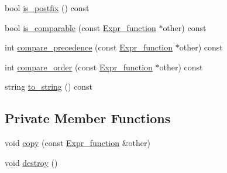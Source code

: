 \begin{DoxyCompactItemize}
bool \hyperlink{classgenevalmag_1_1Expr__function_a8ef52d8fec97d084be0b24e5207a0551}{is\_\-postfix} () const 
\item 
bool \hyperlink{classgenevalmag_1_1Expr__function_a24aaf520c742fde5eff5c8c596549009}{is\_\-comparable} (const \hyperlink{classgenevalmag_1_1Expr__function}{Expr\_\-function} $\ast$other) const 
\item 
int \hyperlink{classgenevalmag_1_1Expr__function_a83c21a4b327d045d8da159d6079dd99c}{compare\_\-precedence} (const \hyperlink{classgenevalmag_1_1Expr__function}{Expr\_\-function} $\ast$other) const 
\item 
int \hyperlink{classgenevalmag_1_1Expr__function_a4608528d2e116c0794eb78f2724b6a18}{compare\_\-order} (const \hyperlink{classgenevalmag_1_1Expr__function}{Expr\_\-function} $\ast$other) const 
\item 
string \hyperlink{classgenevalmag_1_1Expr__function_adaaebd5427337bb2288c47a16af804d8}{to\_\-string} () const 
\end{DoxyCompactItemize}
\subsection*{Private Member Functions}
\begin{DoxyCompactItemize}
\item 
void \hyperlink{classgenevalmag_1_1Expr__function_a4cae50a094103bbfe2c6dba9b1350946}{copy} (const \hyperlink{classgenevalmag_1_1Expr__function}{Expr\_\-function} \&other)
\item 
void \hyperlink{classgenevalmag_1_1Expr__function_a3d90bbd7e17670edc01ba21d8a753315}{destroy} ()
\end{DoxyCompactItemize}
